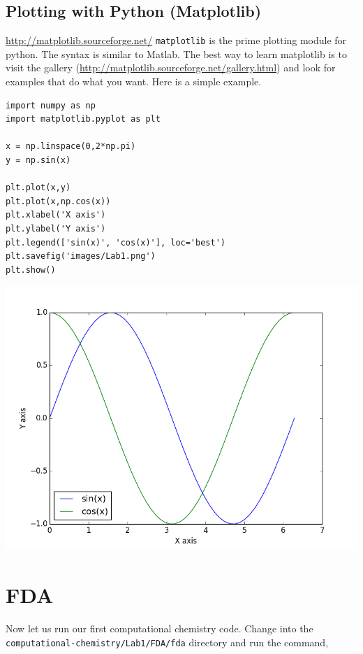 \documentclass[11pt]{article}
\begin{document}
\subsection{Plotting with Python (Matplotlib)}
\label{sec:org18e38a7}
\url{http://matplotlib.sourceforge.net/}
\texttt{matplotlib} is the prime plotting module for python. The syntax is similar to Matlab. The best way to learn matplotlib is to visit the gallery (\url{http://matplotlib.sourceforge.net/gallery.html}) and look for examples that do what you want. Here is a simple example.

\begin{verbatim}
import numpy as np
import matplotlib.pyplot as plt

x = np.linspace(0,2*np.pi)
y = np.sin(x)

plt.plot(x,y)
plt.plot(x,np.cos(x))
plt.xlabel('X axis')
plt.ylabel('Y axis')
plt.legend(['sin(x)', 'cos(x)'], loc='best')
plt.savefig('images/Lab1.png')
plt.show()
\end{verbatim}

\begin{center}
\includegraphics[width=.9\linewidth]{./images/Lab1.png}
\end{center}


\section{FDA}
\label{sec:org5df804a}

Now let us run our first computational chemistry code. Change into the
\texttt{computational-chemistry/Lab1/FDA/fda} directory and run the command,
\end{document}
